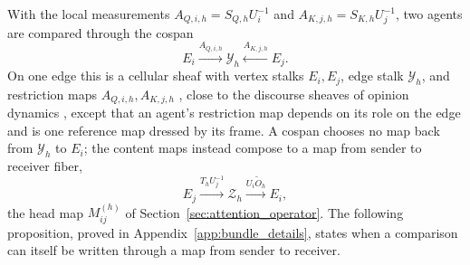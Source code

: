 \documentclass[twoside,11pt]{article}
\begin{document}
With the local measurements \(A_{Q,i,h}=S_{Q,h}U_i^{-1}\) and \(A_{K,j,h}=S_{K,h}U_j^{-1}\), two agents are compared through the cospan
\begin{equation}
E_i\xrightarrow{A_{Q,i,h}}\mathcal Y_h
\xleftarrow{A_{K,j,h}}E_j.
\label{eq:comparison_cospan}
\end{equation}
On one edge this is a cellular sheaf with vertex stalks \(E_i,E_j\), edge stalk \(\mathcal Y_h\), and restriction maps \(A_{Q,i,h},A_{K,j,h}\) \citep{HansenGhrist2019}, close to the discourse sheaves of opinion dynamics \citep{HansenGhrist2021Discourse}, except that an agent's restriction map depends on its role on the edge and is one reference map dressed by its frame. A cospan chooses no map back from \(\mathcal Y_h\) to \(E_i\); the content maps instead compose to a map from sender to receiver fiber,
\[
E_j\xrightarrow{T_hU_j^{-1}}\mathcal Z_h\xrightarrow{U_i\widetilde O_h}E_i,
\]
the head map \(M_{ij}^{(h)}\) of Section~\ref{sec:attention_operator}. The following proposition, proved in Appendix~\ref{app:bundle_details}, states when a comparison can itself be written through a map from sender to receiver.
\end{document}
